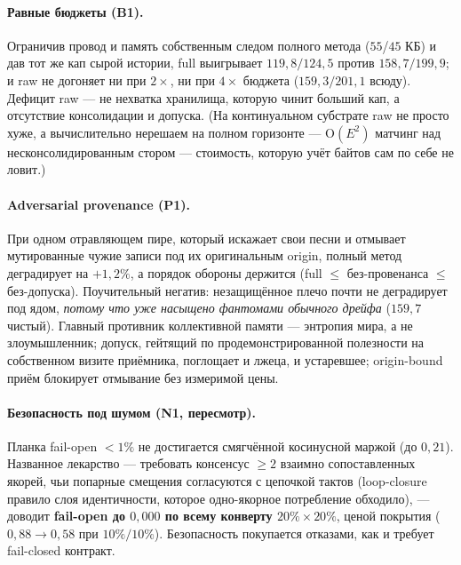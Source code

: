 \documentclass{article}
\begin{document}
\paragraph{Равные бюджеты (B1).} Ограничив провод и память
собственным следом полного метода ($55$/$45$ КБ) и дав тот же кап
сырой истории, full выигрывает $119{,}8/124{,}5$ против
$158{,}7/199{,}9$; и raw не догоняет ни при $2\times$, ни при
$4\times$ бюджета ($159{,}3/201{,}1$ всюду). Дефицит raw --- не
нехватка хранилища, которую чинит больший кап, а отсутствие
консолидации и допуска. (На континуальном субстрате raw не просто
хуже, а вычислительно нерешаем на полном горизонте --- $\mathrm{O}
(E^2)$ матчинг над несконсолидированным стором --- стоимость, которую
учёт байтов сам по себе не ловит.)

\paragraph{Adversarial provenance (P1).} При одном отравляющем пире,
который искажает свои песни и отмывает мутированные чужие записи под
их оригинальным origin, полный метод деградирует на $+1{,}2\%$, а
порядок обороны держится (full $\le$ без-провенанса $\le$
без-допуска). Поучительный негатив: незащищённое плечо почти не
деградирует под ядом, \emph{потому что уже насыщено фантомами
обычного дрейфа} ($159{,}7$ чистый). Главный противник коллективной
памяти --- энтропия мира, а не злоумышленник; допуск, гейтящий по
продемонстрированной полезности на собственном визите приёмника,
поглощает и лжеца, и устаревшее; origin-bound приём блокирует
отмывание без измеримой цены.

\paragraph{Безопасность под шумом (N1, пересмотр).} Планка fail-open
$<1\%$ не достигается смягчённой косинусной маржой (до $0{,}21$).
Названное лекарство --- требовать консенсус $\ge 2$ взаимно
сопоставленных якорей, чьи попарные смещения согласуются с цепочкой
тактов (loop-closure правило слоя идентичности, которое одно-якорное
потребление обходило), --- доводит \textbf{fail-open до $0{,}000$ по
всему конверту $20\%{\times}20\%$}, ценой покрытия ($0{,}88 \to
0{,}58$ при $10\%/10\%$). Безопасность покупается отказами, как и
требует fail-closed контракт.
\end{document}
